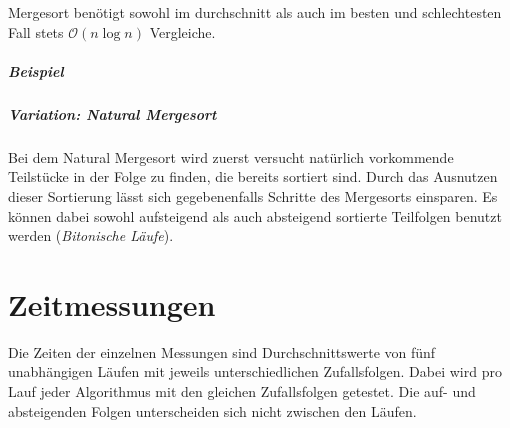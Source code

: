 \documentclass[12pt, a4paper, titlepage, hidelinks]{scrreprt}
\begin{document}
Mergesort benötigt sowohl im durchschnitt als auch im besten und schlechtesten Fall stets $\mathcal{O}(n\log{}n)$ Vergleiche.

\paragraph{Beispiel}

\paragraph{Variation: Natural Mergesort} Bei dem Natural Mergesort wird zuerst versucht natürlich vorkommende Teilstücke in der Folge zu finden, die bereits sortiert sind. Durch das Ausnutzen dieser Sortierung lässt sich gegebenenfalls Schritte des Mergesorts einsparen. Es können dabei sowohl aufsteigend als auch absteigend sortierte Teilfolgen benutzt werden (\textit{Bitonische Läufe}).

\chapter{Zeitmessungen}
Die Zeiten der einzelnen Messungen sind Durchschnittswerte von fünf unabhängigen Läufen mit jeweils unterschiedlichen Zufallsfolgen. Dabei wird pro Lauf jeder Algorithmus mit den gleichen Zufallsfolgen getestet. Die auf- und absteigenden Folgen unterscheiden sich nicht zwischen den Läufen.


\end{document}
